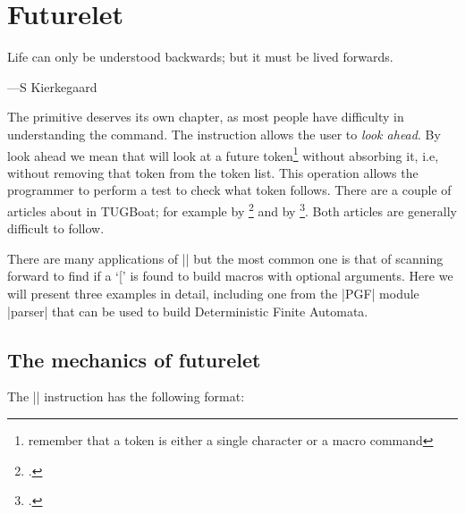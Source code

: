 

\chapter{Futurelet}
\epigraph{Life can only be understood backwards; but it must be lived forwards.}{
---S Kierkegaard}

The  primitive deserves its own chapter, as most people have difficulty in understanding the command. The instruction allows the user to \textit{look ahead}. By look ahead we mean that \tex will look at a future token\footnote{remember that a token is either a single character or a macro command} without absorbing it, i.e, without removing that token from the token list. This operation allows the programmer to perform a test to check what token follows. There are a couple of articles about  in TUGBoat; for example  by \citeauthor{Eijkhout2001}\footcite{Eijkhout2001} and  by \citeauthor{bechto88}\footcite{bechto88}. Both articles are generally difficult to follow. 

There are many applications of |\futurelet| but the most common one is that of scanning forward
to find if a `[' is found to build \latexe macros with optional arguments. Here we will  present three examples in detail, including one from the |PGF| module |parser| that can be used to build Deterministic Finite Automata.


\section{The mechanics of futurelet}

The |\futurelet|
instruction has the following format:


\begin{commands}[]{}
\cmd{\futurelet} 
\end{commands}


